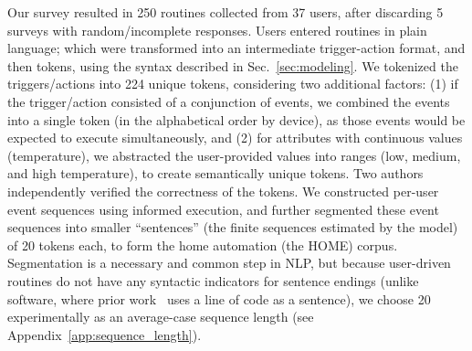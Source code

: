 Our survey resulted in 250 routines collected from 37 users, after discarding 5 surveys with random/incomplete responses.
Users entered routines in plain language; which were transformed into an intermediate trigger-action format, and then tokens, using the syntax described in Sec.~\ref{sec:modeling}.  
We tokenized the triggers/actions into 224 unique tokens, considering two additional factors: (1) if the trigger/action consisted of a conjunction of events, we combined the events into a single token (in the alphabetical order by device), as those events would be expected to execute simultaneously, and (2) for attributes with continuous values (\eg temperature), we abstracted the user-provided values into ranges (\eg low, medium, and high temperature), to create semantically unique tokens.
Two authors independently verified the correctness of the tokens.
 We constructed per-user event sequences using informed execution,
 and further segmented these event sequences into smaller ``sentences'' (\ie the finite sequences estimated by the model) of 20 tokens each, to form the home automation (\ie the {\sf HOME}) corpus.
Segmentation is a necessary and common step in NLP, but because user-driven routines do not have any syntactic indicators for sentence endings (\ie unlike software, where prior work~\cite{Hindle:ICSE12} uses a line of code as a sentence),  we choose 20 experimentally as an average-case sequence length (see Appendix~\ref{app:sequence_length}).
